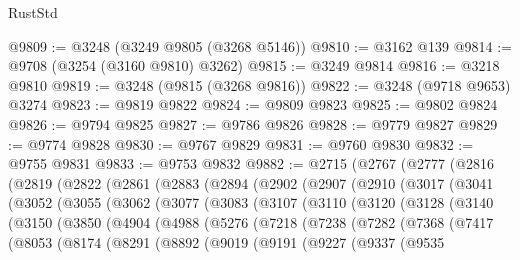 \begin{lexlean}{RustStd}
\begin{coremodule}
{\begin{coremodule}
{{{{{{{{{{{{{{{{{{{{{{{{{@9809 := @3248 (@3249 @9805 (@3268 @5146))
@9810 := @3162 @139
@9814 := @9708 (@3254 (@3160 @9810) @3262)
@9815 := @3249 @9814
@9816 := @3218 @9810
@9819 := @3248 (@9815 (@3268 @9816))
@9822 := @3248 (@9718 @9653) @3274
@9823 := @9819 @9822
@9824 := @9809 @9823
@9825 := @9802 @9824
@9826 := @9794 @9825
@9827 := @9786 @9826
@9828 := @9779 @9827
@9829 := @9774 @9828
@9830 := @9767 @9829
@9831 := @9760 @9830
@9832 := @9755 @9831
@9833 := @9753 @9832
@9882 := @2715
    (@2767
      (@2777
        (@2816
          (@2819
            (@2822
              (@2861
                (@2883
                  (@2894
                    (@2902
                      (@2907
                        (@2910
                          (@3017
                            (@3041
                              (@3052
                                (@3055
                                  (@3062
                                    (@3077
                                      (@3083
                                        (@3107
                                          (@3110
                                            (@3120
                                              (@3128
                                                (@3140
                                                  (@3150
                                                    (@3850
                                                      (@4904
                                                        (@4988
                                                          (@5276
                                                            (@7218
                                                              (@7238
                                                                (@7282
                                                                  (@7368
                                                                    (@7417
                                                                      (@8053
                                                                        (@8174
                                                                          (@8291
                                                                            (@8892
                                                                              (@9019
                                                                                (@9191
                                                                                  (@9227
                                                                                    (@9337
                                                                                      (@9535
}}}}}}}}}}}}}}}}}}}}}}}}}
\end{coremodule}}
\end{coremodule}
\end{lexlean}
